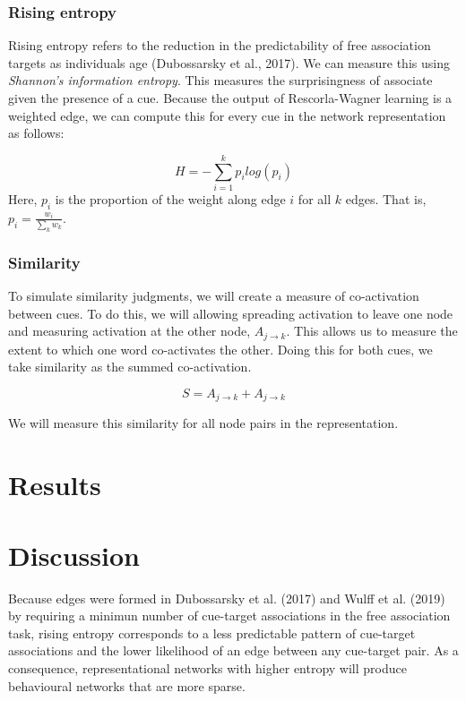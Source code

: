 \documentclass[
  man]{apa6}
\begin{document}
\hypertarget{rising-entropy}{%
\subsubsection{Rising entropy}\label{rising-entropy}}

Rising entropy refers to the reduction in the predictability of free association targets as individuals age (Dubossarsky et al., 2017). We can measure this using \emph{Shannon's information entropy}. This measures the surprisingness of associate given the presence of a cue. Because the output of Rescorla-Wagner learning is a weighted edge, we can compute this for every cue in the network representation as follows:

\[
H = -\sum_{i=1}^{k}  p_i log(p_i)
\] Here, \(p_i\) is the proportion of the weight along edge \(i\) for all \(k\) edges. That is, \(p_i = \frac{w_i}{\sum_k w_k}\).

\hypertarget{similarity}{%
\subsubsection{Similarity}\label{similarity}}

To simulate similarity judgments, we will create a measure of co-activation between cues. To do this, we will allowing spreading activation to leave one node and measuring activation at the other node, \(A_{j \rightarrow k}\). This allows us to measure the extent to which one word co-activates the other. Doing this for both cues, we take similarity as the summed co-activation.

\[
S = A_{j \rightarrow k} + A_{j \rightarrow k}
\]

We will measure this similarity for all node pairs in the representation.

\hypertarget{results}{%
\section{Results}\label{results}}

\hypertarget{discussion}{%
\section{Discussion}\label{discussion}}

Because edges were formed in Dubossarsky et al. (2017) and Wulff et al. (2019) by requiring a minimun number of cue-target associations in the free association task, rising entropy corresponds to a less predictable pattern of cue-target associations and the lower likelihood of an edge between any cue-target pair. As a consequence, representational networks with higher entropy will produce behavioural networks that are more sparse.
\end{document}
